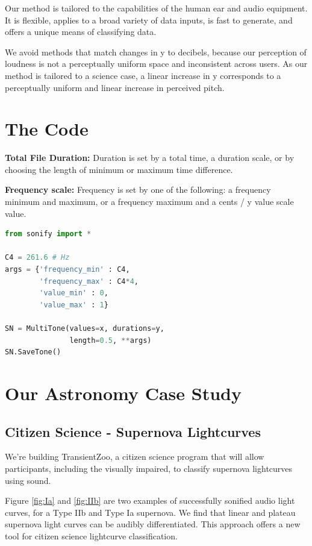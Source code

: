 \documentclass[]{acmsiggraph}
\begin{document}
Our method is tailored to the capabilities of the human ear and audio equipment. It is flexible, applies to a broad variety of data inputs, is fast to generate, and offers a unique means of classifying data.

We avoid methods that match changes in y to decibels, because our perception of loudness is not a perceptually uniform space and inconsistent across users. As our method is tailored to a science case, a linear increase in y corresponds to a perceptually uniform and linear increase in perceived pitch.

\section{The Code}

\textbf{Total File Duration: } Duration is set by a total time, a duration scale, or by choosing the length of minimum or maximum time difference.

\textbf{Frequency scale:} Frequency is set by one of the following: a frequency minimum and maximum, or a frequency maximum and a cents / y value scale value.

\vspace{-1.25\baselineskip}
\begin{lstlisting}[language=Python, frame=lines,label={lst:code_direct}, caption={A simple textured shader.}, basicstyle=\footnotesize]
from sonify import *

C4 = 261.6 # Hz
args = {'frequency_min' : C4,
        'frequency_max' : C4*4,
        'value_min' : 0,
        'value_max' : 1}

SN = MultiTone(values=x, durations=y,
               length=0.5, **args)
SN.SaveTone()
\end{lstlisting}

\section{Our Astronomy Case Study}
\subsection{Citizen Science - Supernova Lightcurves}
We’re building TransientZoo, a citizen science program that will allow participants, including the visually impaired, to classify supernova lightcurves using sound.

Figure \ref{fig:Ia} and \ref{fig:IIb} are two examples of successfully sonified audio light curves, for a Type IIb and Type Ia supernova. We find that linear and plateau supernova light curves can be audibly differentiated. This approach offers a new tool for citizen science lightcurve classification.
\end{document}
